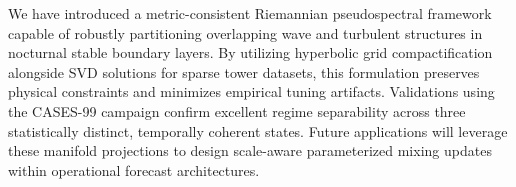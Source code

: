 \documentclass[11pt,a4paper]{article}
\begin{document}
We have introduced a metric-consistent Riemannian pseudospectral framework capable of robustly partitioning overlapping wave and turbulent structures in nocturnal stable boundary layers. By utilizing hyperbolic grid compactification alongside SVD solutions for sparse tower datasets, this formulation preserves physical constraints and minimizes empirical tuning artifacts. Validations using the CASES-99 campaign confirm excellent regime separability across three statistically distinct, temporally coherent states. Future applications will leverage these manifold projections to design scale-aware parameterized mixing updates within operational forecast architectures.



\end{document}
